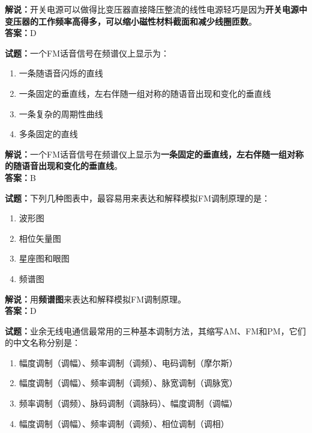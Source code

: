 \documentclass{ctexbook}
\begin{document}
\noindent\textbf{解说：}开关电源可以做得比变压器直接降压整流的线性电源轻巧是因为\textbf{开关电源中变压器的工作频率高得多，可以缩小磁性材料截面和减少线圈匝数}。\\\noindent\textbf{答案：}D%


\bigskip


\noindent\textbf{试题：}一个FM话音信号在频谱仪上显示为：

\begin{enumerate}[leftmargin=3em]
	\item 一条随语音闪烁的直线
	\item 一条固定的垂直线，左右伴随一组对称的随语音出现和变化的垂直线
	\item 一条复杂的周期性曲线
	\item 多条固定的直线
\end{enumerate}

\noindent\textbf{解说：}一个FM话音信号在频谱仪上显示为\textbf{一条固定的垂直线，左右伴随一组对称的随语音出现和变化的垂直线}。\\\noindent\textbf{答案：}B%


\bigskip


\noindent\textbf{试题：}下列几种图表中，最容易用来表达和解释模拟FM调制原理的是：

\begin{enumerate}[leftmargin=3em]
	\item 波形图
	\item 相位矢量图
	\item 星座图和眼图
	\item 频谱图
\end{enumerate}

\noindent\textbf{解说：}用\textbf{频谱图}来表达和解释模拟FM调制原理。\\\noindent\textbf{答案：}D%


\bigskip


\noindent\textbf{试题：}业余无线电通信最常用的三种基本调制方法，其缩写AM、FM和PM，它们的中文名称分别是：

\begin{enumerate}[leftmargin=3em]
	\item 幅度调制（调幅）、频率调制（调频）、电码调制（摩尔斯）
	\item 幅度调制（调幅）、频率调制（调频）、脉宽调制（调脉宽）
	\item 频率调制（调频）、脉码调制（调脉码）、幅度调制（调幅）
	\item 幅度调制（调幅）、频率调制（调频）、相位调制（调相）
\end{enumerate}
\end{document}
